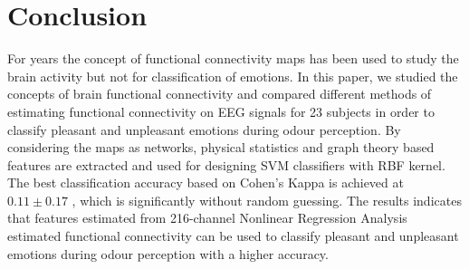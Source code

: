 \section{Conclusion}
For years the concept of functional connectivity maps has been used to study the brain activity but not for classification of emotions. In this paper, we studied the concepts of brain functional connectivity and compared different methods of estimating functional connectivity on EEG signals for 23 subjects in order to classify pleasant and unpleasant emotions during odour perception. By considering the maps as networks, physical statistics and graph theory based features are extracted and used for designing SVM classifiers with RBF kernel. The best classification accuracy based on Cohen's Kappa is achieved at $0.11 \pm 0.17$ , which is significantly without random guessing. The results indicates that features estimated from 216-channel Nonlinear Regression Analysis estimated functional connectivity can be used to classify pleasant and unpleasant emotions during odour perception with a higher accuracy.  
